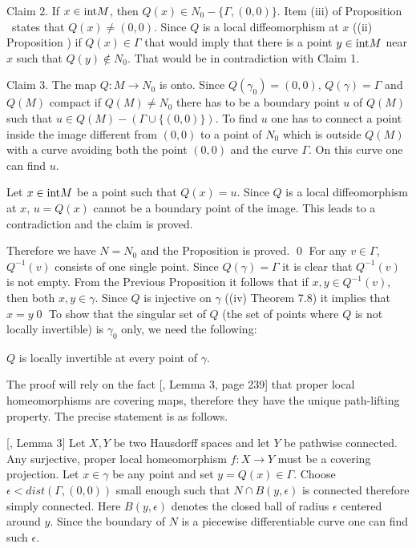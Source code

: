 Claim 2. If $x\in \hbox {int}M$, then $Q(x)\in N_0-\{\Gamma,
(0,0)\}$. Item (iii) of Proposition \injectgamma\ states that $Q(x)\ne (0,0)$.
Since $Q$ is a local diffeomorphism at $x$ ((ii) Proposition \injectgamma) if
$Q(x)\in \Gamma $ that would imply that there is a point $y\in
\hbox {int}M$ near $x$ such that $Q(y)\notin N_0$. That would be
in contradiction with Claim 1.

Claim 3. The map $Q:M\to N_0$ is onto. Since $Q(\gamma _0)=(0,0)$,
$Q(\gamma)=\Gamma$ and $Q(M)$ compact if $Q(M)\ne N_0$ there has
to be a boundary point $u$ of $Q(M)$ such that $u\in Q(M)-(\Gamma
\cup \{(0,0)\})$. To find $u$ one has to connect a point inside
the image different from $(0,0)$ to a point of $N_0$ which is
outside $Q(M)$ with a curve avoiding both the point $(0,0)$ and
the curve $\Gamma$. On this curve one can find $u$.

 Let $x\in \hbox {int}M$ be a point such that
$Q(x)=u$. Since $Q$ is a local diffeomorphism at $x$, $u=Q(x)$
cannot be a boundary point of the image. This leads to a
contradiction and the claim is proved.

Therefore we have $N=N_0$ and  the Proposition is proved. \qed
\enddemo
%
 For any $v\in
\Gamma$, $Q^{-1}(v)$ consists of one single point.
\endproclaim
%
 Since $Q(\gamma)=\Gamma$ it is clear that
$Q^{-1}(v)$ is not empty. From the Previous Proposition it follows
that if $x,y\in Q^{-1}(v)$, then both $x,y\in \gamma$. Since $Q$
is injective on $\gamma$ ((iv) Theorem 7.8) it implies that
$x=y$\qed \enddemo
%
To show that the singular set of $Q$ (the set of points where $Q$
is not locally invertible) is $\gamma_0$ only, we need the
following:

 $Q$ is
locally invertible at every point of $\gamma$.
\endproclaim

The proof will rely on the fact [{\chwuho}, Lemma 3, page 239]
that proper local homeomorphisms are covering maps, therefore they
have the unique path-lifting property. The precise statement is as
follows.

 [{\chwuho}, Lemma
3] Let $X,Y$ be two Hausdorff spaces and let $Y$ be pathwise
connected. Any surjective, proper local homeomorphism $f:X\to Y$
must be a covering projection.
\endproclaim
%
 Let $x\in \gamma$ be
any point and set $y=Q(x)\in \Gamma$. Choose $\epsilon <
dist(\Gamma , (0,0))$ small enough such that $N\cap B(y,\epsilon)$
is connected therefore simply connected. Here $B(y,\epsilon)$
denotes the closed ball of radius $\epsilon$ centered around $y$.
Since the boundary of $N$ is a piecewise differentiable curve one
can find such $\epsilon$.

